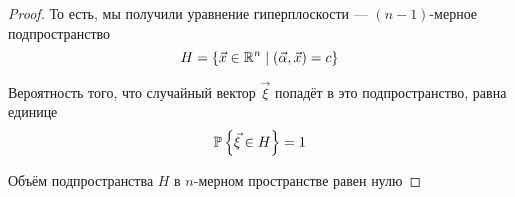 \begin{proof}
    То есть, мы получили уравнение гиперплоскости ---
    $\left( n-1 \right)$-мерное подпространство
    $$H = \left\{ \vec{x} \in \mathbb{R}^n
        \;\middle|\; \left( \vec{\alpha}, \vec{x} \right) = c \right\}$$

    Вероятность того, что случайный вектор $\vec{\xi}$ попадёт в это
    подпространство, равна единице
    $$\mathbb{P}\left\{ \vec{\xi} \in H \right\} = 1$$

    Объём подпространства $H$ в $n$-мерном пространстве равен нулю
\end{proof}
